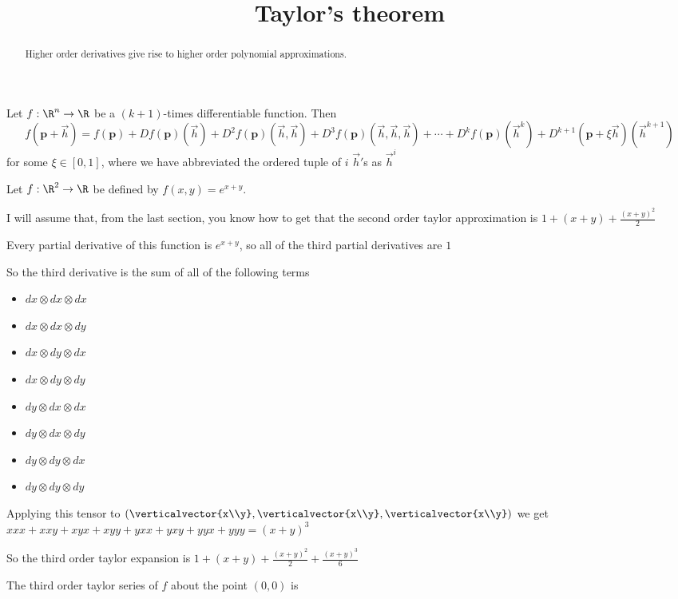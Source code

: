 \documentclass{ximera}
\title{Taylor's theorem}
\begin{document}
\begin{abstract}
	Higher order derivatives give rise to higher order polynomial approximations.
\end{abstract}

\begin{theorem}
	Let $f:\R^n \to \R$ be a $(k+1)$-times differentiable function.  Then
	$$f(\mathbf{p}+\vec{h}) 
	= f(\mathbf{p})+Df(\mathbf{p})(\vec{h})+D^2f(\mathbf{p})(\vec{h},\vec{h})+D^3f(\mathbf{p})(\vec{h},\vec{h},\vec{h})+ \cdots
	+D^kf(\mathbf{p})(\vec{h}^k) + D^{k+1}(\mathbf{p}+\xi\vec{h})(\vec{h}^{k+1})$$ for some $\xi \in [0,1]$,  where we have abbreviated the 
	ordered tuple of $i$ $\vec{h}'$s as $\vec{h}^i$
\end{theorem}

	\begin{question}
		Let $f:\R^2 \to \R$ be defined by $f(x,y) = e^{x+y}$.  
		\begin{solution}
			\begin{hint}
				I will assume that, from the last section, you know how to get that the second order taylor approximation is $1+(x+y)+\frac{(x+y)^2}{2}$
			\end{hint}
			\begin{hint}
				Every partial derivative of this function is $e^{x+y}$, so all of the third partial derivatives are $1$
			\end{hint}
			\begin{hint}
				So the third derivative is the sum of all of the following terms 
				\begin{itemize}
					\item $dx \otimes dx \otimes dx$
					\item $dx \otimes dx \otimes dy$
					\item $dx \otimes dy \otimes dx$
					\item $dx \otimes dy \otimes dy$
					\item $dy \otimes dx \otimes dx$
					\item $dy \otimes dx \otimes dy$
					\item $dy \otimes dy \otimes dx$
					\item $dy \otimes dy \otimes dy$
				\end{itemize}
			\end{hint}
			\begin{hint}
				Applying this tensor to $(\verticalvector{x\\y},\verticalvector{x\\y},\verticalvector{x\\y})$ we get 
				$xxx+xxy+xyx+xyy+yxx+yxy+yyx+yyy = (x+y)^3$
			\end{hint}
			\begin{hint}
				So the third order taylor expansion is $1+(x+y)+\frac{(x+y)^2}{2}+\frac{(x+y)^3}{6}$
			\end{hint}
			The third order taylor series of $f$ about the point $(0,0)$ is 
		\end{solution}
	\end{question}
	
	
	
	
\end{document}

